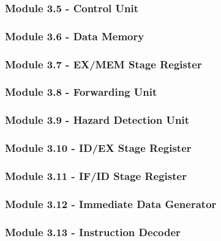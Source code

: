 \documentclass[12pt]{article}
\begin{document}
\subsubsection*{\large Module 3.5 - Control Unit}

\subsubsection*{\large Module 3.6 - Data Memory}

\subsubsection*{\large Module 3.7 - EX/MEM Stage Register}
\label{ex_mem}

\subsubsection*{\large Module 3.8 - Forwarding Unit}
\label{forward}

\subsubsection*{\large Module 3.9 - Hazard Detection Unit}
\label{hdu}

\subsubsection*{\large Module 3.10 - ID/EX Stage Register}
\label{id_ex}

\subsubsection*{\large Module 3.11 - IF/ID Stage Register}
\label{if_id}

\subsubsection*{\large Module 3.12 - Immediate Data Generator}

\subsubsection*{\large Module 3.13 - Instruction Decoder}

\end{document}
